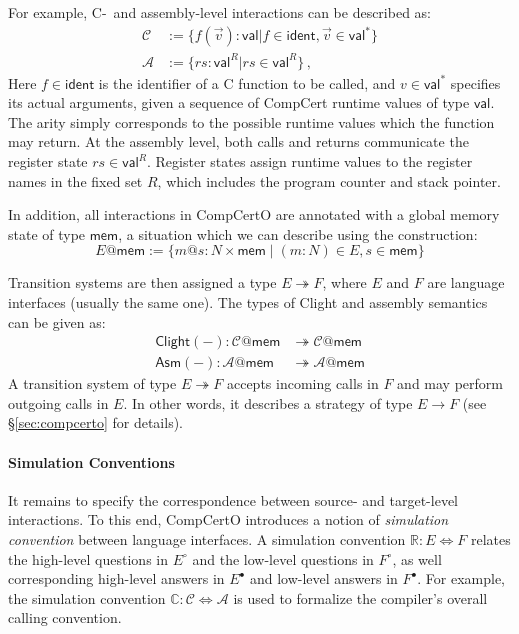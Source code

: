 \documentclass[sigplan,10pt,review,anonymous]{acmart}
\newcommand{\kw}[1]{\ensuremath{ \mathsf{#1} }}
\newcommand{\que}{{\circ}}
\newcommand{\ans}{{\bullet}}
\begin{document}
For example, C-~and assembly-level interactions
can be described as:
\begin{align*}
  \mathcal{C} &:=
    \big\{ f(\vec{v}) : \kw{val} \mathrel{\big|}
       f \in \kw{ident}, \vec{v} \in \kw{val}^* \big\}
  \\
  \mathcal{A} &:=
    \big\{ \mathit{rs} : \kw{val}^R \mathrel{\big|}
       \mathit{rs} \in \kw{val}^R \big\}
  \,,
\end{align*}
Here $f \in \kw{ident}$ is the identifier of
a C function to be called,
and $v \in \kw{val}^*$ specifies its actual arguments,
given a sequence of CompCert runtime values of type $\kw{val}$.
The arity simply corresponds to
the possible runtime values which the function may return.
At the assembly level,
both calls and returns communicate
the register state $\mathit{rs} \in \kw{val}^R$.
Register states assign runtime values
to the register names in the fixed set $R$,
which includes the program counter and stack pointer.

In addition,
all interactions in CompCertO
are annotated with a global memory state of type $\kw{mem}$,
a situation which we can describe using the construction:
\[
  E@\kw{mem} := \{ m@s : N \times \kw{mem} \mid
                   (m : N) \in E, s \in \kw{mem} \}
\]

Transition systems
are then assigned a type
$E \twoheadrightarrow F$,
where $E$ and $F$ are
language interfaces (usually the same one).
The types of Clight and assembly semantics
can be given as:
\begin{align*}
  \kw{Clight}(-) :
    \mathcal{C}@\kw{mem}
   &\twoheadrightarrow
    \mathcal{C}@\kw{mem}
  \\
  \kw{Asm}(-) :
    \mathcal{A}@\kw{mem}
   &\twoheadrightarrow
    \mathcal{A}@\kw{mem}
\end{align*}
A transition system of type $E \twoheadrightarrow F$
accepts incoming calls in $F$
and may perform outgoing calls in $E$.
In other words,
it describes a strategy of type $E \rightarrow F$
(see \S\ref{sec:compcerto} for details).


\paragraph{Simulation Conventions}

It remains to specify the correspondence
between source- and target-level interactions.
To this end,
CompCertO introduces a notion of \emph{simulation convention}
between language interfaces.
A simulation convention $\mathbb{R} : E \Leftrightarrow F$
relates
the high-level questions in $E^\que$ and
the low-level questions in $F^\que$,
as well corresponding
high-level answers in $E^\ans$ and
low-level answers in $F^\ans$.
For example,
the simulation convention
$\mathbb{C} : \mathcal{C} \Leftrightarrow \mathcal{A}$
is used to formalize the compiler's
overall calling convention.
\end{document}
